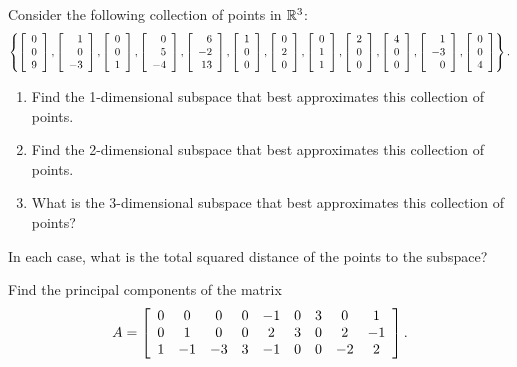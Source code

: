 \documentclass{ximera}
\begin{document}
\begin{exercise}
  Consider the following collection of points in $\R^3$:
  \begin{equation*}
    \set{
      \startmat{r} 0 \\ 0 \\ 9 \stopmat,
      \startmat{r} 1 \\ 0 \\ -3 \stopmat,
      \startmat{r} 0 \\ 0 \\ 1 \stopmat,
      \startmat{r} 0 \\ 5 \\ -4 \stopmat,
      \startmat{r} 6 \\ -2 \\ 13 \stopmat,
      \startmat{r} 1 \\ 0 \\ 0 \stopmat,
      \startmat{r} 0 \\ 2 \\ 0 \stopmat,
      \startmat{r} 0 \\ 1 \\ 1 \stopmat,
      \startmat{r} 2 \\ 0 \\ 0 \stopmat,
      \startmat{r} 4 \\ 0 \\ 0 \stopmat,
      \startmat{r} 1 \\ -3 \\ 0 \stopmat,
      \startmat{r} 0 \\ 0 \\ 4 \stopmat
    }.
  \end{equation*}
  \begin{enumerate}
  \item Find the 1-dimensional subspace that best approximates this
    collection of points.
  \item Find the 2-dimensional subspace that best approximates this
    collection of points.
  \item What is the 3-dimensional subspace that best approximates this
    collection of points?
  \end{enumerate}
  In each case, what is the total squared distance of the points to
  the subspace?
\end{exercise}

\begin{exercise}
  Find the principal components of the matrix
  \begin{equation*}
    A = \startmat{ccccccccc}
      0 & 0 & 0 & 0 & -1 & 0 & 3 & 0 & 1 \\
      0 & 1 & 0 & 0 & 2 & 3 & 0 & 2 & -1 \\
      1 & -1 & -3 & 3 & -1 & 0 & 0 & -2 & 2 \\
    \stopmat.
  \end{equation*}
\end{exercise}
\end{document}

